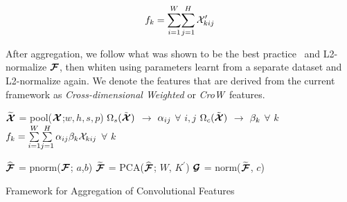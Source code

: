 \documentclass[runningheads]{llncs}
\newcommand{\CroW}{\textit{CroW}~} \newcommand{\Crow}{\CroW}
\begin{document}
\begin{equation}
f_k = {\sum\limits_{i=1}^{W}}{\sum\limits_{j=1}^{H} \mathcal{X}_{kij}^\prime}
\end{equation}

After aggregation, we follow what was shown to be the best practice~\cite{RASC14, ARS+14} and L2-normalize $\bm{\mathcal{F}}$, then whiten using parameters learnt from a separate dataset and L2-normalize again.
We denote the features that are derived from the current framework as \textit{Cross-dimensional Weighted} or \CroW features.








\begin{algorithm}[t]

\DontPrintSemicolon
{}
\newcommand{\commentsty}[1]{{\color{green!50!black}#1}}



\BlankLine

{${\widetilde{\bm{\mathcal{X}}}}$ = pool($\bm{\mathcal{X}}$;$w,h,s,p$) }
{ $\Omega_s(\tilde{\bm{\mathcal{X}}})$ $\rightarrow$ $\alpha_{ij}$ $\forall$ $i,j$    }
{ $\Omega_c(\tilde{\bm{\mathcal{X}}})$ $\rightarrow$ $\beta_{k}$ $\forall$ $k$   }
{$f_k = {\sum\limits_{i=1}^{W}}{\sum\limits_{j=1}^{H} \alpha_{ij} \beta_{k} \mathcal{X}_{kij}}$ $\forall$ $k$
}

{$\widehat{\bm{\mathcal{F}}}$ = pnorm($\bm{\mathcal{F}}$; $a$,$b$) }
{$\widetilde{\bm{\mathcal{F}}}$ = PCA($\widehat{\bm{\mathcal{F}}}$; $W$, $K^{\prime}$) }
{$\bm{\mathcal{G}}$ = norm($\widetilde{\bm{\mathcal{F}}}$, $c$) }
\caption{Framework for Aggregation of Convolutional Features}
\label{alg:general_features}
\end{algorithm}
\end{document}
